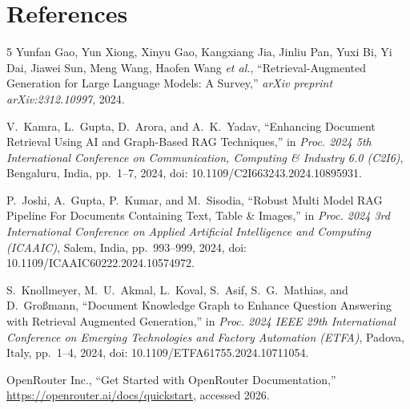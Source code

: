 \documentclass[10pt,a4paper]{article}
\begin{document}
\vspace{-0.6em}
\section{References}
\vspace{-0.6em}
\begingroup
\renewcommand{\section}[2]{}%
\begin{thebibliography}{5}
\footnotesize
\setlength{\itemsep}{-0.5pt}
\setlength{\parskip}{0pt}
Yunfan Gao, Yun Xiong, Xinyu Gao, Kangxiang Jia, Jinliu Pan, Yuxi Bi, Yi Dai, Jiawei Sun, Meng Wang, Haofen Wang \textit{et al.}, ``Retrieval-Augmented Generation for Large Language Models: A Survey,'' \textit{arXiv preprint arXiv:2312.10997}, 2024.

V.~Kamra, L.~Gupta, D.~Arora, and A.~K.~Yadav, ``Enhancing Document Retrieval Using AI and Graph-Based RAG Techniques,'' in \textit{Proc. 2024 5th International Conference on Communication, Computing \& Industry 6.0 (C2I6)}, Bengaluru, India, pp.~1--7, 2024, doi: 10.1109/C2I663243.2024.10895931.

P.~Joshi, A.~Gupta, P.~Kumar, and M.~Sisodia, ``Robust Multi Model RAG Pipeline For Documents Containing Text, Table \& Images,'' in \textit{Proc. 2024 3rd International Conference on Applied Artificial Intelligence and Computing (ICAAIC)}, Salem, India, pp.~993--999, 2024, doi: 10.1109/ICAAIC60222.2024.10574972.

S.~Knollmeyer, M.~U.~Akmal, L.~Koval, S.~Asif, S.~G.~Mathias, and D.~Großmann, ``Document Knowledge Graph to Enhance Question Answering with Retrieval Augmented Generation,'' in \textit{Proc. 2024 IEEE 29th International Conference on Emerging Technologies and Factory Automation (ETFA)}, Padova, Italy, pp.~1--4, 2024, doi: 10.1109/ETFA61755.2024.10711054.

OpenRouter Inc., ``Get Started with OpenRouter Documentation,'' \url{https://openrouter.ai/docs/quickstart}, accessed 2026.
\end{thebibliography}
\endgroup
\end{document}
